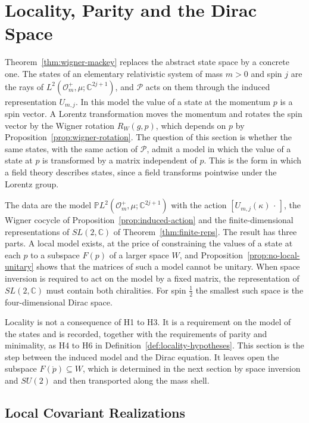 \section{Locality, Parity and the Dirac Space}
\label{sec:locality}

Theorem~\ref{thm:wigner-mackey} replaces the abstract state space by a concrete one. The states of an elementary relativistic system of mass $m>0$ and spin $j$ are the rays of $L^2(\mathcal{O}_m^+,\mu;\mathbb{C}^{2j+1})$, and $\mathcal{P}$ acts on them through the induced representation $U_{m,j}$. In this model the value of a state at the momentum $p$ is a spin vector. A Lorentz transformation moves the momentum and rotates the spin vector by the Wigner rotation $R_W(g,p)$, which depends on $p$ by Proposition~\ref{prop:wigner-rotation}. The question of this section is whether the same states, with the same action of $\mathcal{P}$, admit a model in which the value of a state at $p$ is transformed by a matrix independent of $p$. This is the form in which a field theory describes states, since a field transforms pointwise under the Lorentz group.

The data are the model $\mathbb{P}L^2(\mathcal{O}_m^+,\mu;\mathbb{C}^{2j+1})$ with the action $[U_{m,j}(\kappa)\,\cdot\,]$, the Wigner cocycle of Proposition~\ref{prop:induced-action} and the finite-dimensional representations of $SL(2,\mathbb{C})$ of Theorem~\ref{thm:finite-reps}. The result has three parts. A local model exists, at the price of constraining the values of a state at each $p$ to a subspace $F(p)$ of a larger space $W$, and Proposition~\ref{prop:no-local-unitary} shows that the matrices of such a model cannot be unitary. When space inversion is required to act on the model by a fixed matrix, the representation of $SL(2,\mathbb{C})$ must contain both chiralities. For spin $\frac12$ the smallest such space is the four-dimensional Dirac space.

Locality is not a consequence of H1 to H3. It is a requirement on the model of the states and is recorded, together with the requirements of parity and minimality, as H4 to H6 in Definition~\ref{def:locality-hypotheses}. This section is the step between the induced model and the Dirac equation. It leaves open the subspace $F(\mathring{p})\subseteq W$, which is determined in the next section by space inversion and $SU(2)$ and then transported along the mass shell.

\subsection{Local Covariant Realizations}
\label{subsec:local-realizations}

